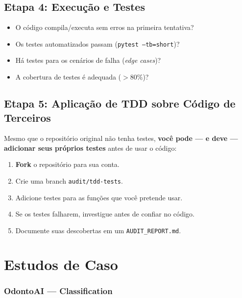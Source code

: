 \subsection{Etapa 4: Execução e Testes}

\begin{itemize}
  \item O código compila/executa sem erros na primeira tentativa?
  \item Os testes automatizados passam (\texttt{pytest --tb=short})?
  \item Há testes para os cenários de falha (\textit{edge cases})?
  \item A cobertura de testes é adequada ($>$80\%)?
\end{itemize}

\subsection{Etapa 5: Aplicação de TDD sobre Código de Terceiros}

Mesmo que o repositório original não tenha testes, \textbf{você pode —
e deve — adicionar seus próprios testes} antes de usar o código:

\begin{enumerate}
  \item \textbf{Fork} o repositório para sua conta.
  \item Crie uma branch \texttt{audit/tdd-tests}.
  \item Adicione testes para as funções que você pretende usar.
  \item Se os testes falharem, investigue antes de confiar no código.
  \item Documente suas descobertas em um \texttt{AUDIT\_REPORT.md}.
\end{enumerate}


\section{Estudos de Caso}

\subsubsection{OdontoAI — Classification}

